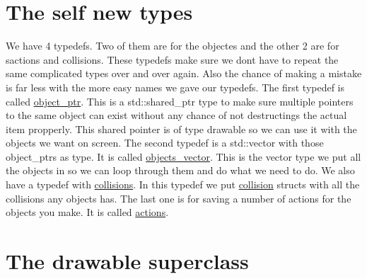 \hypertarget{index_typedefs}{}\section{The self new types}\label{index_typedefs}
We have 4 typedefs. Two of them are for the objectes and the other 2 are for sactions and collisions. These typedefs make sure we dont have to repeat the same complicated types over and over again. Also the chance of making a mistake is far less with the more easy names we gave our typedefs. The first typedef is called \hyperlink{drawable_8hpp_aab5add95f06d2ba25dbfed8eb07274fa}{object\+\_\+ptr}. This is a std\+::shared\+\_\+ptr type to make sure multiple pointers to the same object can exist without any chance of not destructings the actual item propperly. This shared pointer is of type drawable so we can use it with the objects we want on screen. The second typedef is a std\+::vector with those object\+\_\+ptrs as type. It is called \hyperlink{drawable_8hpp_a6c0fdb1dfd0c34dbbdbb5dcd3c608b07}{objects\+\_\+vector}. This is the vector type we put all the objects in so we can loop through them and do what we need to do. We also have a typedef with \hyperlink{drawable_8hpp_a7e1a7f34f6d09dabb4cdafd6e4118603}{collisions}. In this typedef we put \hyperlink{structcollision}{collision} structs with all the collisions any objects has. The last one is for saving a number of actions for the objects you make. It is called \hyperlink{drawable_8hpp_a38f93e4749e0d65d51360c429766d212}{actions}.\hypertarget{index_drawable}{}\section{The drawable superclass}\label{index_drawable}
